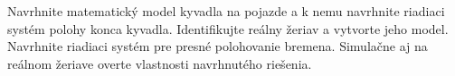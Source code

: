 Navrhnite matematický model kyvadla na pojazde a k nemu navrhnite riadiaci systém polohy konca
kyvadla. Identifikujte reálny žeriav a vytvorte jeho model. Navrhnite riadiaci systém pre presné
polohovanie bremena. Simulačne aj na reálnom žeriave overte vlastnosti navrhnutého riešenia.